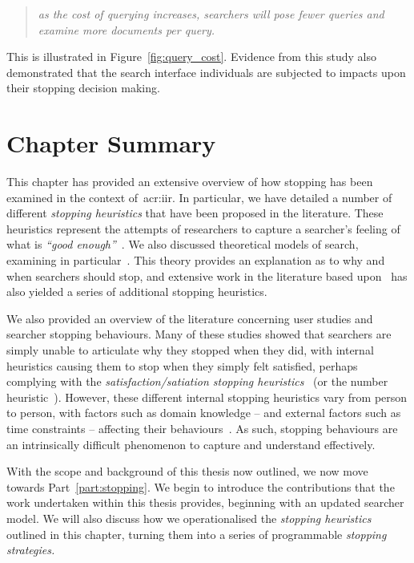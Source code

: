 \begin{quote}
    \emph{as the cost of querying increases, searchers will pose fewer queries and examine more documents per query.}
\end{quote}

This is illustrated in Figure~\ref{fig:query_cost}. Evidence from this study also demonstrated that the search interface individuals are subjected to impacts upon their stopping decision making.

\section{Chapter Summary}
This chapter has provided an extensive overview of how stopping has been examined in the context of~\gls{acr:iir}. In particular, we have detailed a number of different \emph{stopping heuristics} that have been proposed in the literature. These heuristics represent the attempts of researchers to capture a searcher's feeling of what is \emph{``good enough''}~\citep{zach2005enough_is_enough}. We also discussed theoretical models of search, examining in particular~. This theory provides an explanation as to why and when searchers should stop, and extensive work in the literature based upon~ has also yielded a series of additional stopping heuristics.

We also provided an overview of the literature concerning user studies and searcher stopping behaviours. Many of these studies showed that searchers are simply unable to articulate why they stopped when they did, with internal heuristics causing them to stop when they simply felt satisfied, perhaps complying with the \emph{satisfaction/satiation stopping heuristics}~\citep{cooper1973retrieval_effectiveness_ii, kraft1979stopping_rules} (or the number heuristic~\citep{gibb1958number_rule}). However, these different internal stopping heuristics vary from person to person, with factors such as domain knowledge -- and external factors such as time constraints -- affecting their behaviours~\citep{marchionini1995information_seeking}. As such, stopping behaviours are an intrinsically difficult phenomenon to capture and understand effectively.

With the scope and background of this thesis now outlined, we now move towards Part~\ref{part:stopping}. We begin to introduce the contributions that the work undertaken within this thesis provides, beginning with an updated searcher model. We will also discuss how we operationalised the \emph{stopping heuristics} outlined in this chapter, turning them into a series of programmable \emph{stopping strategies.}